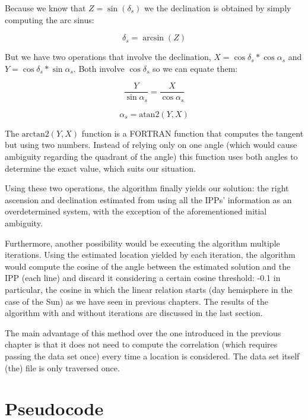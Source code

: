 Because we know that $Z=\sin(\delta_{s})$ we the declination is obtained by simply computing the arc sinus:

\begin{equation} \label{eq:inverseTrigoTriennal}
\delta_{s} = \arcsin(Z)
\end{equation}

But we have two operations that involve the declination, $X=\cos\delta_{s} * \cos\alpha_{s}$ and $Y=\cos\delta_{s} * \sin\alpha_{s}$. Both involve $\cos\delta_{s}$ so we can equate them:

\begin{equation} \label{eq:rmCos}
\frac{Y}{\sin\alpha_{s}} = \frac{X}{\cos\alpha_{s}}
\end{equation}


\begin{equation} \label{eq:inverseTrigoAtan}
\alpha_{s} = \text{atan2}(Y,X)
\end{equation}

The $\text{arctan2}(Y,X)$ function is a FORTRAN function that computes the tangent but using two numbers. Instead of relying only on one angle (which would cause ambiguity regarding the quadrant of the angle) this function uses both angles to determine the exact value, which suits our situation.

Using these two operations, the algorithm finally yields our solution: the right ascension and declination estimated from using all the IPPs' information as an overdetermined system, with the exception of the aforementioned initial ambiguity.

Furthermore, another possibility would be executing the algorithm multiple iterations. Using the estimated location yielded by each iteration, the algorithm would compute the cosine of the angle between the estimated solution and the IPP (each line) and discard it considering a certain cosine threshold: -0.1 in particular, the cosine in which the linear relation starts (day hemisphere in the case of the Sun) as we have seen in previous chapters. The results of the algorithm with and without iterations are discussed in the last section.

The main advantage of this method over the one introduced in the previous chapter is that it does not need to compute the correlation (which requires passing the data set once) every time a location is considered. The data set itself (the) file is only traversed once.

\section{Pseudocode}

